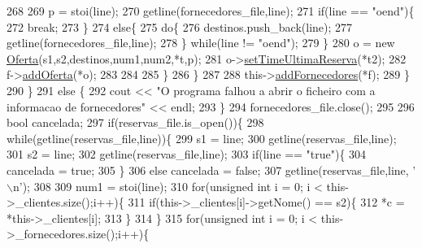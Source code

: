 \begin{DoxyCode}
268 
269                         p = stoi(line);
270                         getline(fornecedores\_file,line);
271                         \textcolor{keywordflow}{if}(line == \textcolor{stringliteral}{"oend"})\{
272                             \textcolor{keywordflow}{break};
273                         \}
274                         \textcolor{keywordflow}{else}\{
275                             \textcolor{keywordflow}{do}\{
276                                 destinos.push\_back(line);
277                                 getline(fornecedores\_file,line);
278                             \} \textcolor{keywordflow}{while}(line != \textcolor{stringliteral}{"oend"});
279                         \}
280                         o = \textcolor{keyword}{new} \hyperlink{classOferta}{Oferta}(s1,s2,destinos,num1,num2,*t,p);
281                         o->\hyperlink{classOferta_a50c041d2301a351f2ac69ed235175116}{setTimeUltimaReserva}(*t2);
282                         f->\hyperlink{classFornecedor_a220373fd19f44a30d7c6c1ec913be700}{addOferta}(*o);
283 
284 
285                     \}
286                 \}
287 
288                 this->\hyperlink{classEmpresa_a0c858479d6e92094adbb2fc085039376}{addFornecedores}(*f);
289             \}
290     \}
291         \textcolor{keywordflow}{else} \{
292             cout << \textcolor{stringliteral}{"O programa falhou a abrir o ficheiro com a informacao de fornecedores"} << endl;
293         \}
294     fornecedores\_file.close();
295 
296     \textcolor{keywordtype}{bool} cancelada;
297     \textcolor{keywordflow}{if}(reservas\_file.is\_open())\{
298         \textcolor{keywordflow}{while}(getline(reservas\_file,line))\{
299             s1 = line;
300             getline(reservas\_file,line);
301             s2 = line;
302             getline(reservas\_file,line);
303             \textcolor{keywordflow}{if}(line == \textcolor{stringliteral}{"true"})\{
304                 cancelada = \textcolor{keyword}{true};
305             \}
306             \textcolor{keywordflow}{else} cancelada = \textcolor{keyword}{false};
307             getline(reservas\_file,line, \textcolor{charliteral}{'\(\backslash\)n'});
308 
309             num1 = stoi(line);
310             \textcolor{keywordflow}{for}(\textcolor{keywordtype}{unsigned} \textcolor{keywordtype}{int} i = 0; i < this->\_clientes.size();i++)\{
311                 \textcolor{keywordflow}{if}(this->\_clientes[i]->getNome() == s2)\{
312                     *c = *this->\_clientes[i];
313                 \}
314             \}
315             \textcolor{keywordflow}{for}(\textcolor{keywordtype}{unsigned} \textcolor{keywordtype}{int} i = 0; i < this->\_fornecedores.size();i++)\{

\end{DoxyCode}

